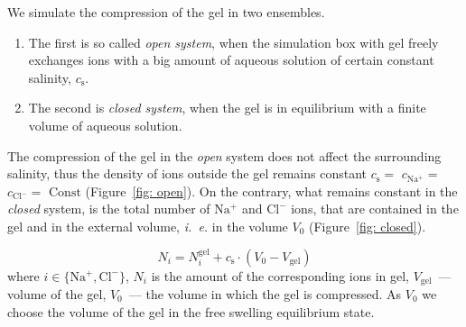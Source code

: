 \documentclass[journal,article,submit,pdftex,moreauthors]{Definitions/mdpi}
\newcommand{\ie}{\textit{i.~e.} }
\newcommand{\cna}{c_\mathrm{Na^+}}
\newcommand{\ccl}{c_\mathrm{Cl^-}}
\newcommand{\nna}{n_\mathrm{Na^+}}
\newcommand{\ncl}{n_\mathrm{Cl^-}}
\newcommand{\gel}{^\mathrm{gel}}
\newcommand{\cl}{\mathrm{Cl^-}}
\newcommand{\na}{\mathrm{Na^+}}
\newcommand{\cs}{c_{\mathrm{s}}}
\newcommand{\Vgel}{V_\mathrm{gel}}
\newcommand{\Vbox}{V_0}
\newcommand{\reffig}[1]{Figure~\ref{#1}}
\begin{document}
We simulate the compression of the gel in two ensembles.
\begin{enumerate}
\item The first is so called \emph{open system}, when the simulation box with gel freely exchanges ions with a big amount of aqueous solution of certain constant salinity, $\cs$. 
\item The second is \emph{closed system}, when the gel is in equilibrium with a finite volume of aqueous solution.
\end{enumerate}
The compression of the gel in the \emph{open} system does not affect the surrounding salinity, thus the density of ions outside the gel remains constant $\cs =$ $\cna=$ $\ccl=$ $\text{Const}$ (\reffig{fig: open}). 
On the contrary, what remains constant in the \emph{closed} system, is the total number of $\na$ and $\cl$ ions, that are contained in the gel and in the external volume, \ie in the volume $\Vbox$ (\reffig{fig: closed}).

\begin{equation}
N_i = N_i\gel + \cs\cdot(\Vbox - \Vgel)
\end{equation}
where $i \in \{\na, \cl\}$,  $N_i$ is the amount of the corresponding ions in gel, $\Vgel$~--- volume of the gel, $\Vbox$~--- the volume in which the gel is compressed. 
As $\Vbox$ we choose the volume of the gel in the free swelling equilibrium state.

\end{document}
